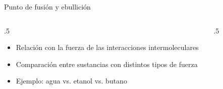 \documentclass[11pt, aspectratio=169, xcolor=table]{beamer}
\begin{document}
\begin{frame}{Punto de fusión y ebullición}
  \begin{columns}
    \begin{column}{.5\textwidth}
      \begin{itemize}[<+->]
        \item Relación con la fuerza de las interacciones intermoleculares
        \item Comparación entre sustancias con distintos tipos de fuerza
        \item Ejemplo: agua vs. etanol vs. butano
      \end{itemize}
    \end{column}

    \begin{column}{.5\textwidth}
      \begin{figure}[ht]
        \centering

      \end{figure}

    \end{column}
  \end{columns}
\end{frame}
\end{document}
